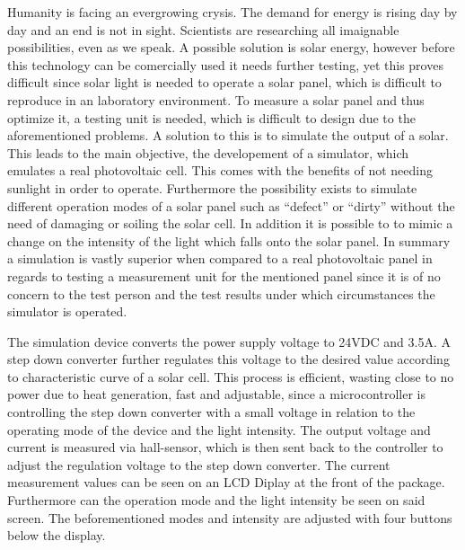 \documentclass[a4paper]{fhnwreport}
\begin{document}
Humanity is facing an evergrowing crysis. The demand for energy is rising day by day and an end is not in sight. Scientists are researching all imaignable possibilities, even as we speak. A possible solution is solar energy, however before this technology can be comercially used it needs further testing, yet this proves difficult since solar light is needed to operate a solar panel, which is difficult to reproduce in an laboratory environment. To measure a solar panel and thus optimize it, a testing unit is needed, which is difficult to design due to the aforementioned problems. A solution to this is to simulate the output of a solar. This leads to the main objective, the developement of a simulator, which emulates a real photovoltaic cell. This comes with the benefits of not needing sunlight in order to operate. Furthermore the possibility exists to simulate different operation modes of a solar panel such as ``defect'' or ``dirty'' without the need of damaging or soiling the solar cell. In addition it is possible to to mimic a change on the intensity of the light which falls onto the solar panel. In summary a simulation is vastly superior when compared to a real photovoltaic panel in regards to testing a measurement unit for the mentioned panel since it is of no concern to the test person and the test results under which circumstances the simulator is operated. 

The simulation device converts the power supply voltage to 24VDC and 3.5A. A step down converter further regulates this voltage to the desired value according to characteristic curve of a solar cell. This process is efficient, wasting close to no power due to heat generation, fast and adjustable, since a microcontroller is controlling the step down converter with a small voltage in relation to the operating mode of the device and the light intensity. The output voltage and current is measured via hall-sensor, which is then sent back to the controller to adjust the regulation voltage to the step down converter. The current measurement values can be seen on an LCD Diplay at the front of the package. Furthermore can the operation mode and the light intensity be seen on said screen. The beforementioned modes and intensity are adjusted with four buttons below the display.
\end{document}
